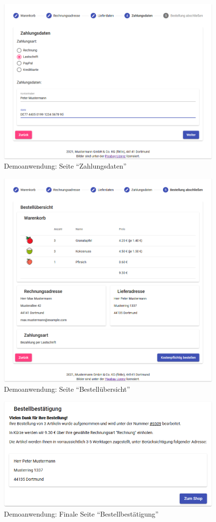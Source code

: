 \begin{figure}[H]
	\centering
	\includegraphics[width=0.75\linewidth]{img/04_erstellung-poc/demoanwendung_vorstellung_04-zahlungsdaten.png}
	\caption{Demoanwendung: Seite \enquote{Zahlungsdaten}}
	\label{fig:demoanwendung_vorstellung_04-zahlungsdaten}
\end{figure}

\begin{figure}[H]
	\centering
	\includegraphics[width=0.75\linewidth]{img/04_erstellung-poc/demoanwendung_vorstellung_05-bestelluebersicht.png}
	\caption{Demoanwendung: Seite \enquote{Bestellübersicht}}
	\label{fig:demoanwendung_vorstellung_05-bestelluebersicht}
\end{figure}

\begin{figure}[H]
	\centering
	\includegraphics[width=0.75\linewidth]{img/04_erstellung-poc/demoanwendung_vorstellung_06-bestellbestaetigung.png}
	\caption{Demoanwendung: Finale Seite \enquote{Bestellbestätigung}}
	\label{fig:demoanwendung_vorstellung_06-bestellbestaetigung}
\end{figure}

